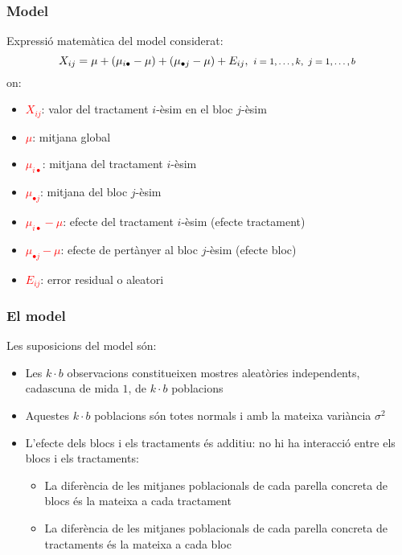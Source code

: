 \documentclass[12pt,t]{beamer}
\newcommand{\red}[1]{\textcolor{red}{#1}}
\renewcommand{\emph}[1]{{\color{red}#1}}
\theoremstyle{plain}
\theoremstyle{definition}
\begin{document}
\begin{frame}
\frametitle{Model}
\vspace*{-2ex}

\emph{Expressió matemàtica} del model considerat:
$$
\hspace*{-1ex} X_{ij}=\mu+ (\mu_{i\bullet}-\mu) +(\mu_{\bullet j}-\mu) + E_{ij}, \ \mbox{\footnotesize $i=1,\ldots,k,\ j=1,\ldots,b$}
$$
on:
\begin{itemize}
\item \red{$X_{ij}$}: valor del tractament $i$-èsim en el bloc $j$-èsim 
\smallskip

\item  \red{$\mu$}: mitjana global
\smallskip

\item  \red{$\mu_{i\bullet}$}: mitjana del  tractament $i$-èsim
\smallskip

\item  \red{$\mu_{\bullet j}$}:  mitjana del  bloc $j$-èsim
\smallskip

\item \red{$\mu_{i\bullet}-\mu$}: efecte del
tractament $i$-èsim (\emph{efecte tractament})
\smallskip

\item \red{$\mu_{\bullet j}-\mu$}: efecte de pertànyer al bloc
$j$-èsim (\emph{efecte bloc})
\smallskip

\item \red{$E_{ij}$}: error residual o aleatori
\end{itemize}
\end{frame}


\begin{frame}
\frametitle{El model}

Les suposicions del model són:
\begin{itemize}

\item Les $k\cdot b$ observacions constitueixen mostres aleatòries
independents, cadascuna de mida $1$, de $k\cdot b$ poblacions
\medskip

\item Aquestes $k\cdot b$ poblacions són totes normals i amb la mateixa
variància $\sigma^2$
\medskip

\item L'efecte dels blocs i els tractaments és \emph{additiu}: no hi ha \emph{interacció} entre els blocs i els tractaments:

\begin{itemize}
\item La diferència de les mitjanes poblacionals de cada parella concreta de blocs és la mateixa a cada tractament \smallskip

\item  La diferència de les mitjanes poblacionals de cada parella concreta de tractaments és la mateixa a cada bloc 
\end{itemize}
\end{itemize}
\end{frame}
\end{document}
